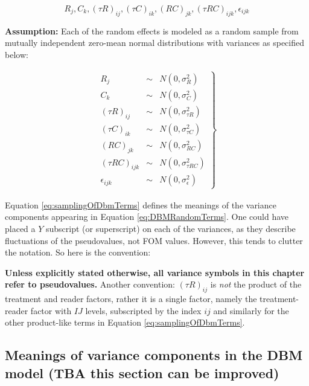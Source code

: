 \documentclass[
]{book}
\begin{document}
\begin{equation}
R_j, C_k, (\tau R)_{ij}, (\tau C)_{ik}, (RC)_{jk},  (\tau RC)_{ijk},  \epsilon_{ijk}
\label{eq:DBMRandomTerms}
\end{equation}

\textbf{Assumption:} Each of the random effects is modeled as a random sample from mutually independent zero-mean normal distributions with variances as specified below:

\begin{align}
\left.\begin{array}{rll}
{R_j}&\sim& N\left ( 0,\sigma_{R}^{2} \right ) \\[0.5em]
{C_k}&\sim& N\left ( 0,\sigma_{C}^{2} \right ) \\[0.5em]
{(\tau R)_{ij}}&\sim& N\left ( 0,\sigma_{\tau R}^{2} \right ) \\[0.5em]
{(\tau C)_{ik}}&\sim& N\left ( 0,\sigma_{\tau C}^{2} \right ) \\[0.5em]
{(RC)_{jk}}&\sim& N\left ( 0,\sigma_{RC}^{2} \right ) \\[0.5em]
{(\tau RC)_{ijk}}&\sim& N\left ( 0,\sigma_{\tau RC}^{2} \right ) \\[0.5em]
\epsilon_{ijk} &\sim& N\left ( 0,\sigma_{\epsilon}^{2} \right )
\end{array}\right\}
\label{eq:samplingOfDbmTerms}
\end{align}

Equation \eqref{eq:samplingOfDbmTerms} defines the meanings of the variance components appearing in Equation \eqref{eq:DBMRandomTerms}. One could have placed a \(Y\) subscript (or superscript) on each of the variances, as they describe fluctuations of the pseudovalues, not FOM values. However, this tends to clutter the notation. So here is the convention:

\textbf{Unless explicitly stated otherwise, all variance symbols in this chapter refer to pseudovalues. }
Another convention: \((\tau R)_{ij}\) is \emph{not} the product of the treatment and reader factors, rather it is a single factor, namely the treatment-reader factor with \(IJ\) levels, subscripted by the index \(ij\) and similarly for the other product-like terms in Equation \eqref{eq:samplingOfDbmTerms}.

\hypertarget{meanings-of-variance-components-in-the-dbm-model-tba-this-section-can-be-improved}{%
\subsection{\texorpdfstring{Meanings of variance components in the DBM model (\textbf{TBA this section can be improved})}{Meanings of variance components in the DBM model (TBA this section can be improved)}}\label{meanings-of-variance-components-in-the-dbm-model-tba-this-section-can-be-improved}}
\end{document}
